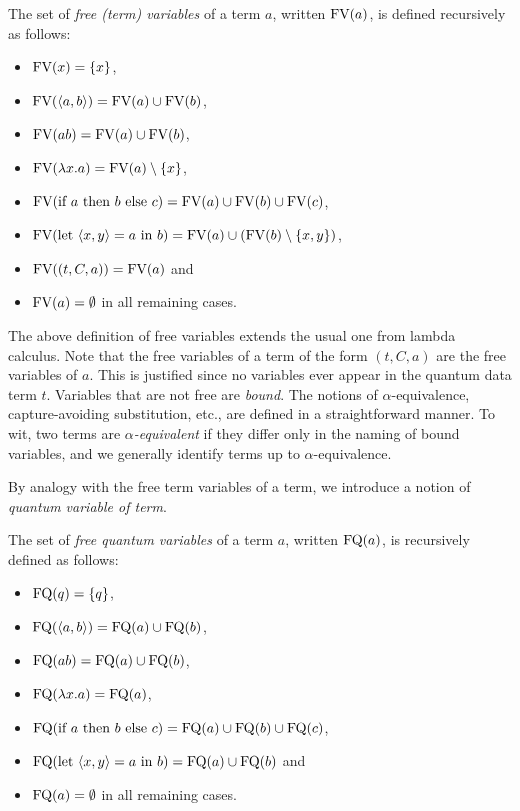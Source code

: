 \documentclass[twoside]{article}
\begin{document}
\begin{definition}
The set of \emph{free (term) variables} of a term $a$, written $\FV(a)$, 
is defined recursively as follows:
\begin{itemize}
  \item $\FV(x)=\s{x}$,
  \item $\FV(\p{a,b})=\FV(a)\cup \FV(b)$,
  \item $\FV(ab)=\FV(a)\cup \FV(b)$,
  \item $\FV(\lambda x.a)=\FV(a)\setminus\s{x}$,
  \item $\FV(\ifthenelse{a}{b}{c}) = \FV(a) \cup \FV(b) \cup \FV(c)$,
  \item $\FV(\letin{\p{x,y}}{a}{b}) = \FV(a)\cup (\FV(b)\setminus \s{x,y})$,
  \item $\FV((t,C,a))= \FV(a)$ and
  \item $\FV(a)=\emptyset$ in all remaining cases.
\end{itemize}
\end{definition}

The above definition of free variables extends the usual one from
lambda calculus. Note that the free variables of a term of the form
$(t,C,a)$ are the free variables of $a$. This is justified since no
variables ever appear in the quantum data term $t$. Variables that are
not free are {\em bound}. The notions of $\alpha$-equivalence,
capture-avoiding substitution, etc., are defined in a straightforward
manner. To wit, two terms are {\em $\alpha$-equivalent} if they differ
only in the naming of bound variables, and we generally identify terms
up to $\alpha$-equivalence.

By analogy with the free term variables of a term, we introduce a
notion of \emph{quantum variable of term}.

\begin{definition}
  The set of \emph{free quantum variables} of a term $a$, written
  $\FQ(a)$, is recursively defined as follows:
\begin{itemize}
  \item $\FQ(q)=\s{q}$,
  \item $\FQ(\p{a,b})=\FQ(a)\cup \FQ(b)$,
  \item $\FQ(ab)=\FQ(a)\cup \FQ(b)$,
  \item $\FQ(\lambda x.a)=\FQ(a)$,
  \item $\FQ(\ifthenelse{a}{b}{c}) = \FQ(a) \cup \FQ(b) \cup \FQ(c)$,
  \item $\FQ(\letin{\p{x,y}}{a}{b})= \FQ(a)\cup \FQ(b)$ and
  \item $\FQ(a)=\emptyset$ in all remaining cases.
\end{itemize}
\end{definition}
\end{document}
